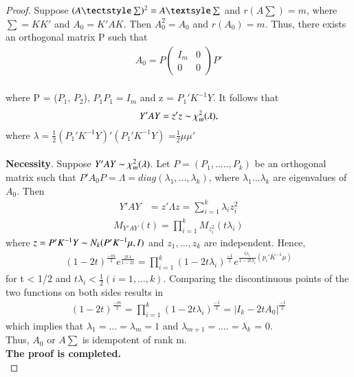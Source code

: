\documentclass[journal,12pt,twocolumn]{IEEEtran}
\begin{document}
\begin{proof}
 Suppose $(A \tectstyle \sum)^2=A \textsyle \sum$  and  $r(A \textstyle\sum)=m$, where $\sum= KK'$ and $A_0= K'AK$. Then $A_0^2 =A_0$ and $r(A_0) = m.$ Thus, there exists an orthogonal matrix P such that\\
\begin{align}
    A_0=P\begin{pmatrix}I_m & 0\\ 0 & 0 \end{pmatrix}P'
\end{align}
\\where P = ($P_1$, $P_2$), $P_1P_1 = I_m$ and z = $P_1'K^{-1}Y$. It follows that\\
\begin{align}
Y'AY = z'z \thicksim \chi_m^2(\lambda),
\end{align}
where $\lambda =\frac{1}{2}(P_1'K^{-1}Y)'(P_1'K^{-1}Y)$ =$\frac{1}{2}\mu\mu'$\\
\\\textbf{Necessity}. Suppose $Y'AY \thicksim \chi_m^2(\lambda)$. Let $P = (P_1,....., P_k)$ be an orthogonal
matrix such that $P'A_0P =\Lambda = diag(\lambda_1,..., \lambda_k)$, where $\lambda_1 $\geq$ ... $\geq$\lambda_k$ are eigenvalues of $A_0$. Then\\
\begin{align}
Y'AY &=z'\Lambda z =\sum_{i=1}^{k} \lambda_i z_i^2 
\end{align}
\begin{align} M_{Y'AY}(t)=\prod\limits_{i=1}^{k}M_{z_i^2}(t\lambda_i)
\end{align}
where $z = P'K^{-1}Y \thicksim N_k(P'K^{-1}\mu ,I)$ and  $z_1, ..., z_k$ are independent. Hence,\\
\begin{align}
(1-2t)^{\frac{-m}{2}}e^{\frac{2t\lambda}{1-2t}}=\prod\limits_{i=1}^{k}(1-2t\lambda_i)^{\frac{-1}{2}}e^{\frac{t\lambda_i}{1-2t\lambda_i}(p_i'K^{-1}\mu)}
\end{align}
for t < 1/2 and $t \lambda_i <\frac{1}{2} (i = 1, ..., k)$. Comparing the discontinuous points of
the two functions on both sides results in\\
\begin{align}
    (1-2t)^{\frac{-m}{2}}=\prod\limits_{i=1}^{k}(1-2t\lambda_i)^{\frac{-1}{2}}=|I_k-2t A_0|^{\frac{-1}{2}}
\end{align}
which implies that $\lambda_1 = ... = \lambda_m = 1$ and $\lambda_{m+1}= ....=\lambda_{k}$ = 0.\\
Thus, $A_0$ or $A\sum$ is idempotent of rank m.\\
\textbf{The proof is completed.}\\
\end{proof}
\end{document}
